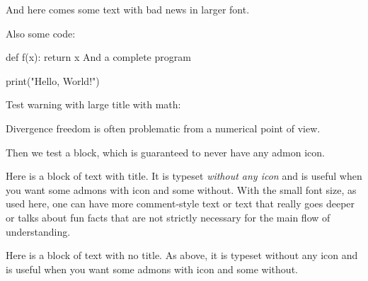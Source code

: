 \documentclass[%
oneside,                 %
final,                   %
10pt]{article}
\newenvironment{warning_mdfboxadmon}[1][]{
\begin{warning_mdfboxmdframed}[frametitle=#1]
}
{
\end{warning_mdfboxmdframed}
}
\newenvironment{block_mdfboxadmon}[1][]{
\begin{block_mdfboxmdframed}[frametitle=#1]
}
{
\end{block_mdfboxmdframed}
}
\begin{document}
\begin{warning_mdfboxadmon}
{\large And here comes some text with bad news in larger font.

Also some code:

def f(x):
    return x
And a complete program

print("Hello, World!")
\par}
\end{warning_mdfboxadmon} %



Test warning with large title with math:


\begin{warning_mdfboxadmon}[{\large Watch out for $\nabla\cdot\bm{u}=0$ equations}.]
{\large Divergence freedom is often problematic from a numerical point
of view.
\par}
\end{warning_mdfboxadmon} %



Then we test a block, which is guaranteed to never have any admon icon.


\begin{block_mdfboxadmon}
\vspace{0.5mm}\par\noindent
{\footnotesize Here is a block of text with title. It is typeset
\emph{without any icon} and is useful when you want some admons with icon
and some without. With the small font size, as used here, one can have
more comment-style text or text that really goes deeper or talks
about fun facts that are not strictly necessary for the main flow
of understanding.
\par}
\end{block_mdfboxadmon} %




\begin{block_mdfboxadmon}[]
Here is a block of text with no title. As above, it is typeset without any icon
and is useful when you want some admons with icon and some without.
\end{block_mdfboxadmon} %



\end{document}
